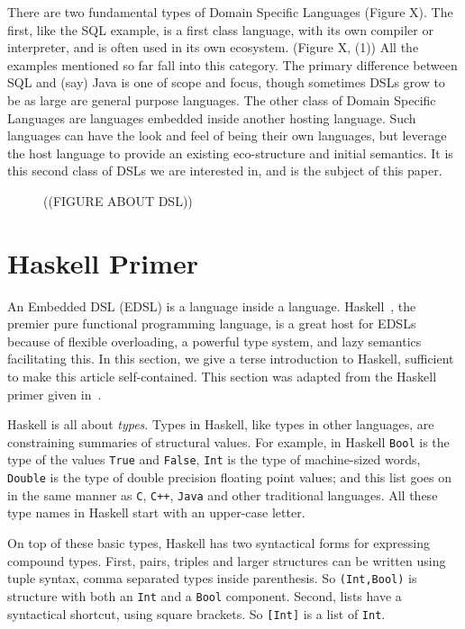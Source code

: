 \documentclass[11pt]{article}
\begin{document}
There are two fundamental types of Domain Specific Languages
(Figure X).
%
The first, like the SQL example, is a first class language,
with its own compiler or interpreter, and is often used in
its own ecosystem. (Figure X, (1)) 
All the examples mentioned so far fall
into this category. The primary difference between SQL and
(say) Java is one of scope and focus, though sometimes
DSLs grow to be as large are general purpose languages.
%
The other class of Domain Specific Languages are languages
embedded inside another hosting language. Such languages
can have the look and feel of being their own languages,
but leverage the host language to provide an existing
eco-structure and initial semantics. It is this second
class of DSLs we are interested in, and is the subject of
this paper.

\begin{figure}
        
        
\vskip 1in        
((FIGURE ABOUT DSL))

\end{figure}

\section{Haskell Primer}

An Embedded DSL (EDSL) is a language inside a language.
Haskell~\cite{Haskell98Book}, the premier pure functional programming language, is a great host for EDSLs
because of flexible overloading, a powerful type system, and lazy semantics facilitating this.
In this section, we give a terse
introduction to Haskell, 
sufficient to make this article self-contained. This section was
adapted from the Haskell primer given in~\cite{?}.

Haskell is all about {\em types\/}. Types in Haskell, like
types in other languages, are constraining summaries of structural values.
For example, in Haskell \verb|Bool| is the type of the values
\verb|True| and \verb|False|, \verb|Int| is the type of machine-sized
words, \verb|Double| is the type of double precision floating
point values; and this list goes on in the same manner as
\verb|C|, \verb|C++|, \verb|Java| and other traditional languages.
All these type names in Haskell start with an upper-case letter.

On top of these basic types, Haskell has two syntactical forms for expressing
compound types.
First, pairs, triples and larger structures can be written using tuple syntax,
comma separated types inside parenthesis.
So \verb|(Int,Bool)| is structure with both an \verb|Int| and a \verb|Bool| component.
Second, lists have a syntactical shortcut, using square brackets.
So \verb|[Int]| is a list of \verb|Int|.
\end{document}
